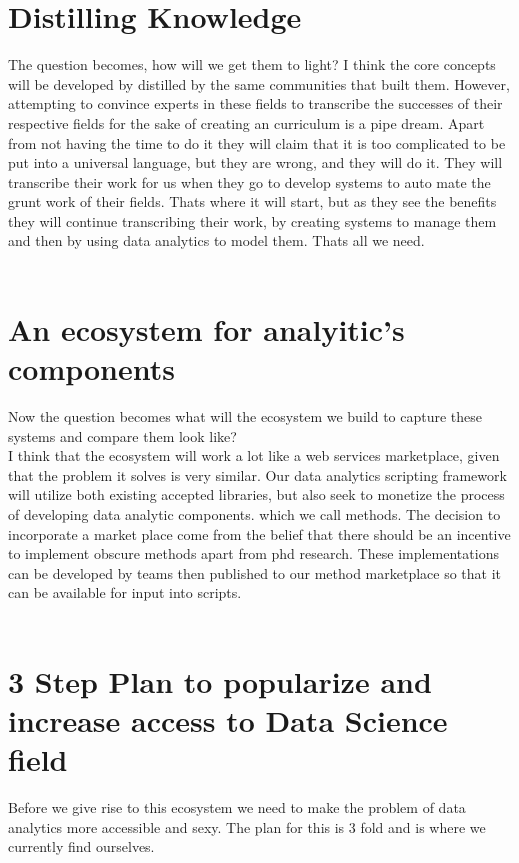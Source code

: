 \documentclass[11pt]{amsart}
\begin{document}
\section{Distilling Knowledge}
The question becomes, how will we get them to light? I think the core concepts will be developed by distilled by the same communities that built them.  However, attempting to convince experts in these fields to transcribe the successes of their respective fields for the sake of creating an curriculum is a pipe dream. Apart from not having the time to do it they will claim that it is too complicated to be put into a universal language, but they are wrong, and they will do it.  They will transcribe their work for us when they go to develop systems to auto mate the grunt work of their fields.  Thats where it will start, but as they see the benefits they will continue transcribing their work, by creating systems to manage them and then by using data analytics to model them.  Thats all we need.\\ \\
\section{An ecosystem for analyitic's components}
Now the question becomes what will the ecosystem we build to capture these systems and compare them look like?\\
I think that the ecosystem will work a lot like a web services marketplace, given that the problem it solves is very similar.  Our data analytics scripting framework will utilize both existing accepted libraries, but also seek to monetize the process of developing data analytic components. which we call methods.  The decision to incorporate a market place come from the belief that there should be an incentive to implement obscure methods apart from phd research.  These implementations can be developed by teams then published to our method marketplace so that it can be available for input into scripts.\\ \\
\section{3 Step Plan to popularize and increase access to Data Science field}
Before we give rise to this ecosystem we need to make the problem of data analytics more accessible and sexy.  The plan for this is 3 fold and is where we currently find ourselves. \\ \\
\end{document}
